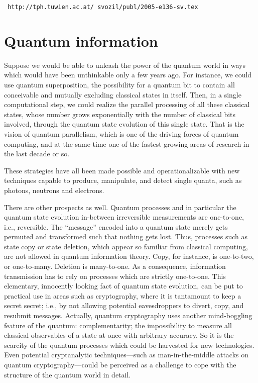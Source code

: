 \documentclass[pra,amsfonts,showpacs,preprint,showkeys]{revtex4}
\begin{document}
{\tt
http://tph.tuwien.ac.at/~svozil/publ/2005-e136-sv.tex
}

\section{Quantum information}

Suppose we would be able to unleash the power of the quantum world in ways which would have been unthinkable
only a few years ago.
For instance, we could use quantum superposition, the possibility for a quantum bit to contain
all conceivable and mutually excluding classical states in itself.
Then, in a single computational step, we could realize the parallel processing of all these classical states,
whose number grows exponentially with the number of classical bits involved,
through the quantum state evolution of this single state.
That is the vision of quantum parallelism,
which is one of the driving forces of quantum computing, and at the same time
one of the fastest growing  areas of research in the last decade or so.

These strategies have all been made possible and operationalizable with new techniques
capable to produce, manipulate, and detect single quanta, such as photons, neutrons and electrons.

There are other prospects as well.
Quantum processes and in particular the quantum state evolution in-between irreversible measurements
are one-to-one, i.e., reversible.
The ``message'' encoded into a quantum state merely gets permuted and transformed such that nothing gets lost.
Thus, processes such as state copy or state deletion, which appear so familiar from classical computing,
are not allowed in quantum information theory.
Copy, for instance, is one-to-two, or one-to-many.
Deletion is many-to-one.
As a consequence, information transmission has to rely on processes which are strictly one-to-one.
This elementary, innocently looking fact of quantum state evolution, can be put to practical use
in areas such as cryptography, where it is tantamount to keep a secret secret; i.e., by not allowing
potential eavesdroppers to divert, copy, and resubmit messages.
Actually, quantum cryptography uses another mind-boggling feature of the quantum: complementarity;
the impossibility to measure all classical observables of a state at once with arbitrary accuracy.
So it is the scarcity of the quantum processes which could be harvested for new technologies.
Even potential cryptanalytic techniques---such as man-in-the-middle attacks
on quantum cryptography---could be perceived
as a challenge to cope with the structure of the quantum world in detail.
\end{document}
